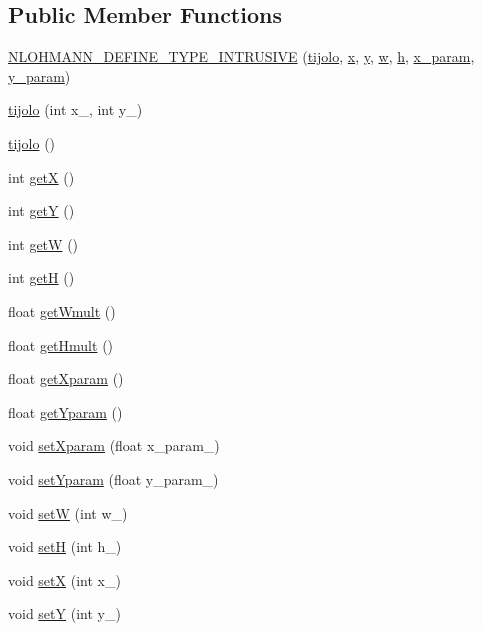 \subsection*{Public Member Functions}
\begin{DoxyCompactItemize}
\item 
\hyperlink{classtijolo_addedf3e33eb8134576997ef0c29d918a}{N\+L\+O\+H\+M\+A\+N\+N\+\_\+\+D\+E\+F\+I\+N\+E\+\_\+\+T\+Y\+P\+E\+\_\+\+I\+N\+T\+R\+U\+S\+I\+VE} (\hyperlink{classtijolo}{tijolo}, \hyperlink{classtijolo_acd39a70440853d5f019378ab501fb688}{x}, \hyperlink{classtijolo_a3089987dab8db697303f88bd59c0989f}{y}, \hyperlink{classtijolo_a11e0c9ba0ab09baad2622ba49de44f8a}{w}, \hyperlink{classtijolo_ad96e30c66b061844a9a3f3b60d4bfcf2}{h}, \hyperlink{classtijolo_a14a93338f6c68097ba6e8afe18a32f60}{x\+\_\+param}, \hyperlink{classtijolo_ab4b4106e1ff29da211d56df195bb919a}{y\+\_\+param})
\item 
\hyperlink{classtijolo_a1575297d58f55111b16bfde06d7fcf14}{tijolo} (int x\+\_\+, int y\+\_\+)
\item 
\hyperlink{classtijolo_ab85f837336b5668d8db4a1119034493d}{tijolo} ()
\item 
int \hyperlink{classtijolo_ab3179398dd6fe44db34eb23556ccd029}{getX} ()
\item 
int \hyperlink{classtijolo_ad5d4edc964d42505990ab3c0e739f175}{getY} ()
\item 
int \hyperlink{classtijolo_a940e6fd9de3320009415b3ee5d9a89ea}{getW} ()
\item 
int \hyperlink{classtijolo_ad742e39614eec9ad0ac8d1e386fee696}{getH} ()
\item 
float \hyperlink{classtijolo_acb8367de6befb88b131e3cb8dd4be70f}{get\+Wmult} ()
\item 
float \hyperlink{classtijolo_ac3b530ef0293d8d5973fa2087c7ea9b9}{get\+Hmult} ()
\item 
float \hyperlink{classtijolo_aa2ec8732cec3b95a13bb3cbdbd533011}{get\+Xparam} ()
\item 
float \hyperlink{classtijolo_acee30dfee179445d4d42d815e781d96f}{get\+Yparam} ()
\item 
void \hyperlink{classtijolo_a962fd6769fcf78defe69bb77cc881172}{set\+Xparam} (float x\+\_\+param\+\_\+)
\item 
void \hyperlink{classtijolo_ad5d5063df5809d7b8db5a8c55649f1cc}{set\+Yparam} (float y\+\_\+param\+\_\+)
\item 
void \hyperlink{classtijolo_a6f5eed3413774d0e4d9ee7505a0a68e3}{setW} (int w\+\_\+)
\item 
void \hyperlink{classtijolo_ac15a68731bbf0019493a54ab0bccb04d}{setH} (int h\+\_\+)
\item 
void \hyperlink{classtijolo_afce75411c77a0f53037c33e7a3321d4b}{setX} (int x\+\_\+)
\item 
void \hyperlink{classtijolo_ac1d41f557b4d2170dc4fd4ff53a78c13}{setY} (int y\+\_\+)
\end{DoxyCompactItemize}

